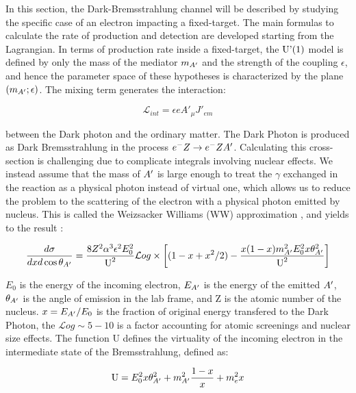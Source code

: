 In this section, the Dark-Bremsstrahlung channel will be described by studying the specific case of an electron impacting a fixed-target. The main formulas to calculate the rate of production and detection are developed starting from the Lagrangian. In terms of production rate inside a fixed-target, the $\textrm{U'(1)}$ model is defined by only the mass of the mediator $m_{A'}$ and the strength of the coupling $\epsilon$, and hence the parameter space of these hypotheses is characterized by the plane $(m_{A'};\epsilon)$. The mixing term generates the interaction:

\begin{equation}
  \label{eq:dm-interaction}
  \mathcal{L}_{int} = \epsilon e A'_{\mu}J'_{em}
\end{equation}

between the Dark photon and the ordinary matter. The Dark Photon is produced as Dark Bremsstrahlung in the process $e^- Z \to e^- Z A'$. Calculating this cross-section is challenging due to complicate integrals involving nuclear effects. We instead assume that the mass of $A'$ is large enough to treat the $\gamma$ exchanged in the reaction as a physical photon instead of virtual one, which allows us to reduce the problem to the scattering of the electron with a physical photon emitted by nucleus. This is called the Weizsacker Williams (WW) approximation \cite{Kim:1973he}, and yields to the result \cite{jdb}:

\begin{equation}
  \label{eq:dm-diff-cross}
  \frac{d\sigma}{dxd\cos{\theta_{A'}}} = \frac{8 Z^2 \alpha^3 \epsilon^2 E^2_0}{\textrm{U}^2} \mathcal{L}og \times \left[ (1 - x + x^2/2) - \frac{x(1-x)m^2_{A'}E^2_0 x \theta^2_{A'}}{\textrm{U}^2} \right]
\end{equation}

$E_0$ is the energy of the incoming electron, $E_{A'}$ is the energy of the emitted $A'$, $\theta_{A'}$ is the angle of emission in the lab frame, and Z is the atomic number of the nucleus. $x=E_{A'}/E_0$ is the fraction of original energy transfered to the Dark Photon, the $\mathcal{L}og \sim 5 - 10$ is a factor accounting for atomic screenings and nuclear size effects. The function U defines the virtuality of the incoming electron in the intermediate state of the Bremsstrahlung, defined as:

\begin{equation}
  \label{eq:u-func}
  \textrm{U} = E^2_0 x \theta^2_{A'} + m^2_{A'} \frac{1 - x}{x} + m^2_e x
\end{equation}

